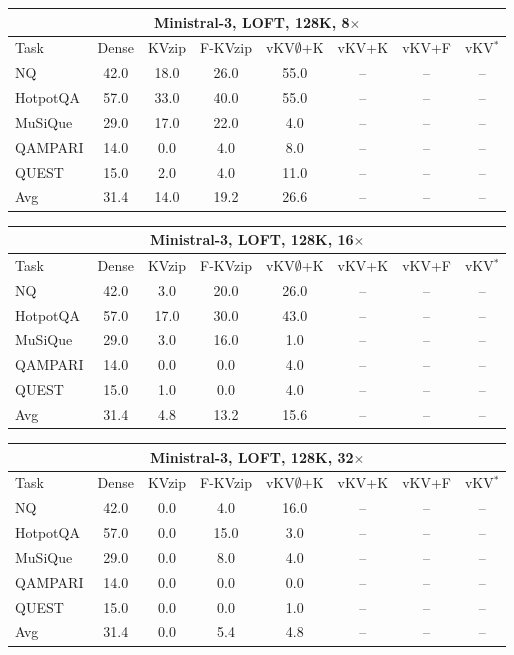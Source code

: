 \begin{tabular}{lccccccc}
\toprule
\multicolumn{8}{c}{Ministral-3, LOFT, 128K, 8$\times$} \\
\midrule
Task & Dense & KVzip & F-KVzip & vKV$\emptyset$+K & vKV+K & vKV+F & vKV$^\ast$ \\
\midrule
NQ & 42.0 & 18.0 & 26.0 & 55.0 & -- & -- & -- \\
HotpotQA & 57.0 & 33.0 & 40.0 & 55.0 & -- & -- & -- \\
MuSiQue & 29.0 & 17.0 & 22.0 & 4.0 & -- & -- & -- \\
QAMPARI & 14.0 & 0.0 & 4.0 & 8.0 & -- & -- & -- \\
QUEST & 15.0 & 2.0 & 4.0 & 11.0 & -- & -- & -- \\
\midrule
Avg & 31.4 & 14.0 & 19.2 & 26.6 & -- & -- & -- \\
\bottomrule
\end{tabular}
\vspace{0.8em}

\begin{tabular}{lccccccc}
\toprule
\multicolumn{8}{c}{Ministral-3, LOFT, 128K, 16$\times$} \\
\midrule
Task & Dense & KVzip & F-KVzip & vKV$\emptyset$+K & vKV+K & vKV+F & vKV$^\ast$ \\
\midrule
NQ & 42.0 & 3.0 & 20.0 & 26.0 & -- & -- & -- \\
HotpotQA & 57.0 & 17.0 & 30.0 & 43.0 & -- & -- & -- \\
MuSiQue & 29.0 & 3.0 & 16.0 & 1.0 & -- & -- & -- \\
QAMPARI & 14.0 & 0.0 & 0.0 & 4.0 & -- & -- & -- \\
QUEST & 15.0 & 1.0 & 0.0 & 4.0 & -- & -- & -- \\
\midrule
Avg & 31.4 & 4.8 & 13.2 & 15.6 & -- & -- & -- \\
\bottomrule
\end{tabular}
\vspace{0.8em}

\begin{tabular}{lccccccc}
\toprule
\multicolumn{8}{c}{Ministral-3, LOFT, 128K, 32$\times$} \\
\midrule
Task & Dense & KVzip & F-KVzip & vKV$\emptyset$+K & vKV+K & vKV+F & vKV$^\ast$ \\
\midrule
NQ & 42.0 & 0.0 & 4.0 & 16.0 & -- & -- & -- \\
HotpotQA & 57.0 & 0.0 & 15.0 & 3.0 & -- & -- & -- \\
MuSiQue & 29.0 & 0.0 & 8.0 & 4.0 & -- & -- & -- \\
QAMPARI & 14.0 & 0.0 & 0.0 & 0.0 & -- & -- & -- \\
QUEST & 15.0 & 0.0 & 0.0 & 1.0 & -- & -- & -- \\
\midrule
Avg & 31.4 & 0.0 & 5.4 & 4.8 & -- & -- & -- \\
\bottomrule
\end{tabular}
\vspace{0.8em}


